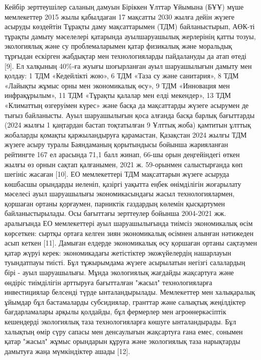 \begin{multicols}{2}
Кейбір зерттеушілер саланың дамуын Біріккен Ұлттар Ұйымына (БҰҰ) мүше
мемлекеттер 2015 жылы қабылдаған 17 мақсатты 2030 жылға дейін жүзеге
асыруды көздейтін Тұрақты даму мақсаттарымен (ТДМ) байланыстырып, АӨК-ті
тұрақты дамыту мәселелері қатарында ауылшаруашылық жерлерінің қатты
тозуы, экологиялық және су проблемаларымен қатар физикалық және
моральдық тұрғыдан ескірген жабдықтар мен технологияларды пайдалануды да
атап өтеді {[}9{]}. Ел халқының 40\%-ға жуығы шоғырланған ауыл
шаруашылығын дамыту мен қолдау: 1 ТДМ «Кедейлікті жою», 6 ТДМ «Таза су
және санитария», 8 ТДМ «Лайықты жұмыс орны мен экономикалық өсу», 9 ТДМ
«Инновация мен инфрақұрылым», 11 ТДМ «Тұрақты қалалар мен елді
мекендер», 13 ТДМ «Климаттың өзгеруімен күрес» және басқа да мақсаттарды
жүзеге асырумен де тығыз байланысты. Ауыл шаруашылығын қоса алғанда
басқа барлық бағыттарды (2024 жылғы 1 қаңтардан бастап тоқтатылған 9
Ұлттық жоба) қамтитын ұлттық жобаларды қомақты қаржыландыруға
қарамастан, Қазақстан 2024 жылғы ТДМ жүзеге асыру туралы Баяндаманың
қорытындысы бойынша жарияланған рейтингте 167 ел арасында 71,1 балл
жинап, 66-шы орын деңгейіндегі өткен жылғы өз орнын сақтап қалғанымен,
2021 ж. 59-орынмен салыстырғанда көп шегініс жасаған {[}10{]}. ЕО
мемлекеттері ТДМ мақсаттарын жүзеге асыруда көшбасшы орындарды иеленіп,
қазіргі уақытта еңбек өнімділігін жоғарылату мәселесі ауыл шаруашылығы
экономикасындағы жасыл технологиялармен, қоршаған ортаны қорғаумен,
парниктік газдардың көлемін қысқартумен байланыстырылады. Осы бағыттағы
зерттеулер бойынша 2004-2021 жж. аралығында ЕО мемлекеттері ауыл
шаруашылығында тиімсіз экономикалық өсім көрсеткен: сыртқы ортаға келген
зиян экономикалық өсімнен алынған нәтижеден асып кеткен {[}11{]}.
Дамыған елдерде экономикалық өсу қоршаған ортаны сақтаумен қатар жүруі
керек: экономикадағы жетістіктер экожүйелердің нашарлауын туындатпауы
тиісті. Бұл тұжырымдама жүзеге асырылатын негізгі салалардың бірі - ауыл
шаруашылығы. Мұнда экологиялық жағдайды жақсартуға және өндіріс
тиімділігін арттыруға бағытталған "жасыл" технологияларға инвестициялар
белсенді түрде ынталандырылады. Мемлекеттер мен халықаралық ұйымдар бұл
бастамаларды субсидиялар, гранттар және салықтық жеңілдіктер
бағдарламалары арқылы қолдайды, бұл фермерлер мен агроөнеркәсіптік
кешендерді экологиялық таза технологияларға көшуге ынталандырады. Бұл
халықтың өмір сүру сапасы мен денсаулығын жақсартуға ғана емес, сонымен
қатар "жасыл" жұмыс орындарын құруға және экологиялық таза нарықтарды
дамытуға жаңа мүмкіндіктер ашады {[}12{]}.


\end{multicols}

